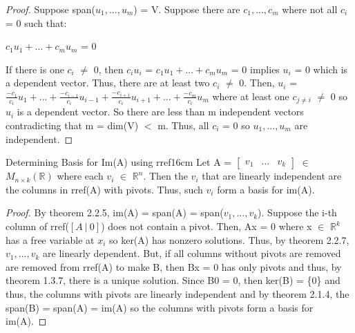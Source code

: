 \begin{proof}
        \vspace{0.2cm}

        Suppose span($u_1,...,u_m$) = V.
        Suppose there are $c_1,...,c_m$ where not all $c_i$ = 0 such that:

        \hspace{0.5cm}
        $c_1u_1 + ... + c_mu_m$ = 0

        If there is one $c_i$ $\not =$ 0, then
        $c_iu_i$ = $c_1u_1 + ... + c_mu_m$ = 0 implies $u_i$ = 0
        which is a dependent vector. Thus, there are at least two
        $c_i$ $\not =$ 0. Then, $u_i$ =
        $\frac{-c_1}{c_i}u_1 + ... + \frac{-c_{i-1}}{c_i}u_{i-1}
        + \frac{-c_{i+1}}{c_i}u_{i+1} + ... + \frac{-c_m}{c_i}u_m$
        where at least one $c_{j \not = i}$ $\not =$ 0
        so $u_i$ is a dependent vector. So there are less than m
        independent vectors contradicting that m = dim(V) $<$ m.
        Thus, all $c_i$ = 0 so $u_1,...,u_m$ are independent.
    \end{proof}

    \newpage



    \begin{wtheorem}{Determining Basis for Im(A) using rref}{16cm}
        Let A =
        $\begin{bmatrix}
            v_1 & ... & v_k
        \end{bmatrix}$ $\in$ $M_{n \times k}(\mathbb{R})$
        where each $v_i$ $\in$ $\mathbb{R}^n$.
        Then the $v_i$ that are linearly independent are the columns in rref(A)
        with pivots.
        Thus, such $v_i$ form a basis for im(A).
    \end{wtheorem}

    \begin{proof}
        By {\color{red} theorem 2.2.5}, im(A) = span(A) = span($v_1,...,v_k$).
        Suppose the i-th column of rref($[A \ | \ 0]$) does not contain a pivot.
        Then, Ax = 0 where x $\in$ $\mathbb{R}^k$ has a free variable at $x_i$
        so ker(A) has nonzero solutions.
        Thus, by {\color{red} theorem 2.2.7}, $v_1,...,v_k$
        are linearly dependent.
        But, if all columns without pivots are removed are removed from rref(A)
        to make B, then Bx = 0 has only pivots and thus, by
        {\color{red} theorem 1.3.7}, there is a unique solution.
        Since B0 = 0, then ker(B) = \{0\}
        and thus, the columns with pivots are linearly independent
        and by {\color{red} theorem 2.1.4}, the span(B) = span(A) = im(A)
        so the columns with pivots form a basis for im(A).
    \end{proof}

